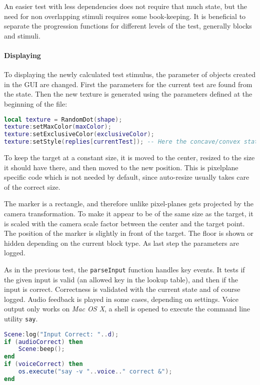 An easier test with less dependencies does not require that much state, but the need for non overlapping stimuli requires some book-keeping.
It is beneficial to separate the progression functions for different levels of the test, generally blocks and stimuli.

\paragraph{Displaying}
To displaying the newly calculated test stimulus, the parameter of objects created in the GUI are changed.
First the parameters for the current test are found from the state.
Then the new texture is generated using the parameters defined at the beginning of the file:

\begin{lstlisting}[language=lua,firstnumber=202]
local texture = RandomDot(shape);
texture:setMaxColor(maxColor);
texture:setExclusiveColor(exclusiveColor);
texture:setStyle(replies[currentTest]); -- Here the concave/convex status is set
\end{lstlisting}

To keep the target at a constant size, it is moved to the center, resized to the size it should have there, and then moved to the new position.
This is pixelplane specific code which is not needed by default, since auto-resize usually takes care of the correct size.

The marker is a rectangle, and therefore unlike pixel-planes gets projected by the camera transformation.
To make it appear to be of the same size as the target, it is scaled with the camera scale factor between the center and the target point.
The position of the marker is slightly in front of the target.
The floor is shown or hidden depending on the current block type.
As last step the parameters are logged.

As in the previous test, the \texttt{parseInput} function handles key events.
It tests if the given input is valid (an allowed key in the lookup table), and then if the input is correct.
Correctness is validated with the current state and of course logged.
Audio feedback is played in some cases, depending on settings.
Voice output only works on \textit{Mac OS X}, a shell is opened to execute the command line utility \texttt{say}.

\begin{lstlisting}[language=lua,firstnumber=202]
Scene:log("Input Correct: "..d);
if (audioCorrect) then
	Scene:beep();
end
if (voiceCorrect) then
	os.execute("say -v "..voice.." correct &");
end
\end{lstlisting}


